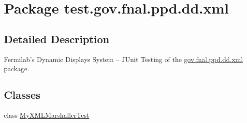 \hypertarget{namespacetest_1_1gov_1_1fnal_1_1ppd_1_1dd_1_1xml}{\section{Package test.\-gov.\-fnal.\-ppd.\-dd.\-xml}
\label{namespacetest_1_1gov_1_1fnal_1_1ppd_1_1dd_1_1xml}
}


\subsection{Detailed Description}
Fermilab's Dynamic Displays System -- J\-Unit Testing of the \hyperlink{namespacetest_1_1gov_1_1fnal_1_1ppd_1_1dd_1_1xml}{gov.\-fnal.\-ppd.\-dd.\-xml} package.\subsection*{Classes}
\begin{DoxyCompactItemize}
\item 
class \hyperlink{classtest_1_1gov_1_1fnal_1_1ppd_1_1dd_1_1xml_1_1MyXMLMarshallerTest}{My\-X\-M\-L\-Marshaller\-Test}
\end{DoxyCompactItemize}

